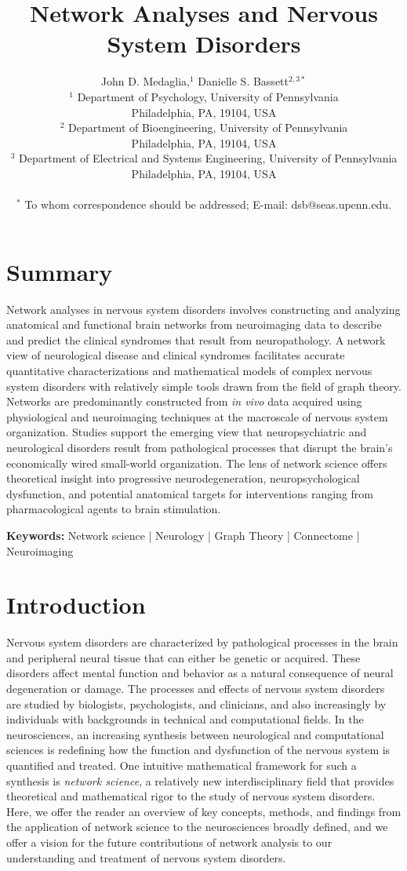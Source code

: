\documentclass[12pt]{article}
\title{Network Analyses and Nervous System Disorders}
\author
{John D. Medaglia,$^{1}$ Danielle S. Bassett$^{2,3\ast}$\\
	\normalsize{$^{1}$ Department of Psychology, University of Pennsylvania}\\
	\normalsize{Philadelphia, PA, 19104, USA}\\
	\normalsize{$^{2}$ Department of Bioengineering, University of Pennsylvania}\\
	\normalsize{Philadelphia, PA, 19104, USA}\\
	\normalsize{$^{3}$ Department of Electrical and Systems Engineering, University of Pennsylvania}\\
	\normalsize{Philadelphia, PA, 19104, USA}\\
	\\
	\normalsize{$^\ast$ To whom correspondence should be addressed; E-mail:  dsb@seas.upenn.edu.}
}
\begin{document}
 

\baselineskip24pt

\maketitle 

\clearpage
\newpage

\singlespacing
\section*{Summary}
Network analyses in nervous system disorders involves constructing and analyzing anatomical and functional brain networks from neuroimaging data to describe and predict the clinical syndromes that result from neuropathology. A network view of neurological disease and clinical syndromes facilitates accurate quantitative characterizations and mathematical models of complex nervous system disorders with relatively simple tools drawn from the field of graph theory. Networks are predominantly constructed from \emph{in vivo} data acquired using physiological and neuroimaging techniques at the macroscale of nervous system organization. Studies support the emerging view that neuropsychiatric and neurological disorders result from pathological processes that disrupt the brain’s economically wired small-world organization. The lens of network science offers theoretical insight into progressive neurodegeneration, neuropsychological dysfunction, and potential anatomical targets for interventions ranging from pharmacological agents to brain stimulation.
\vspace{10mm}

\textbf{Keywords:} Network science | Neurology | Graph Theory | Connectome | Neuroimaging
\newpage


\section*{Introduction}

Nervous system disorders are characterized by pathological processes in the brain and peripheral neural tissue that can either be genetic or acquired. These disorders affect mental function and behavior as a natural consequence of neural degeneration or damage. The processes and effects of nervous system disorders are studied by biologists, psychologists, and clinicians, and also increasingly by individuals with backgrounds in technical and computational fields. In the neurosciences, an increasing synthesis between neurological and computational sciences is redefining how the function and dysfunction of the nervous system is quantified and treated. One intuitive mathematical framework for such a synthesis is \emph{network science}, a relatively new interdisciplinary field that provides theoretical and mathematical rigor to the study of nervous system disorders. Here, we offer the reader an overview of key concepts, methods, and findings from the application of network science to the neurosciences broadly defined, and we offer a vision for the future contributions of network analysis to our understanding and treatment of nervous system disorders.
\end{document}
